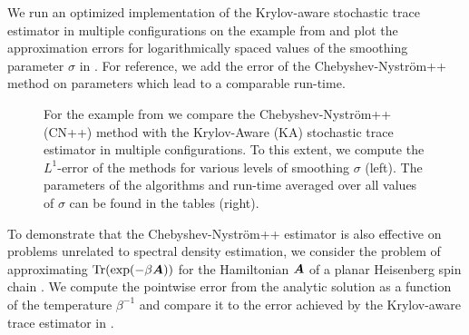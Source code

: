 We run an optimized implementation of the Krylov-aware stochastic trace estimator \cite[Algorithm 3.1]{chen-2023-krylovaware-stochastic} in multiple configurations on the example from  and plot the approximation errors for logarithmically spaced values of the smoothing parameter $\sigma$ in . For reference, we add the error of the Chebyshev-Nyström++ method on parameters which lead to a comparable run-time.

\begin{figure}[ht]
    \begin{minipage}[c]{.475\linewidth}
        \centering
        
    \end{minipage}\hfill%
    \begin{minipage}[c]{.475\linewidth}
        \vspace{-35pt}
        
        \newline
        \vspace{15pt}
        \newline
        
    \end{minipage}
    \caption{For the example from  we compare the Chebyshev-Nyström++ (CN++) method with the Krylov-Aware (KA) stochastic trace estimator in multiple configurations. To this extent, we compute the $L^1$-error of the methods for various levels of smoothing $\sigma$ (left). The parameters of the algorithms and run-time averaged over all values of $\sigma$ can be found in the tables (right).}
    \label{fig:krylov-aware-density}
\end{figure}

To demonstrate that the Chebyshev-Nyström++ estimator is also effective on problems unrelated to spectral density estimation, we consider the problem of approximating $\operatorname{Tr}(\exp(-\beta \boldsymbol{A}))$ for the Hamiltonian $\boldsymbol{A}$ of a planar Heisenberg spin chain \cite{chen-2023-krylovaware-stochastic}. We compute the pointwise error from the analytic solution as a function of the temperature $\beta^{-1}$ and compare it to the error achieved by the Krylov-aware trace estimator in .


